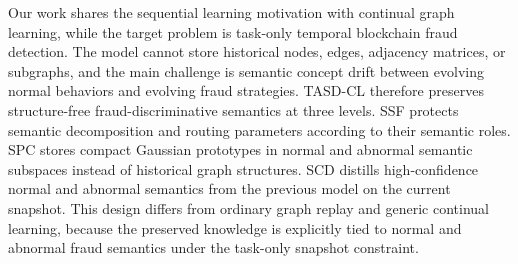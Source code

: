 Our work shares the sequential learning motivation with continual graph learning, while the target problem is task-only temporal blockchain fraud detection. The model cannot store historical nodes, edges, adjacency matrices, or subgraphs, and the main challenge is semantic concept drift between evolving normal behaviors and evolving fraud strategies. TASD-CL therefore preserves structure-free fraud-discriminative semantics at three levels. SSF protects semantic decomposition and routing parameters according to their semantic roles. SPC stores compact Gaussian prototypes in normal and abnormal semantic subspaces instead of historical graph structures. SCD distills high-confidence normal and abnormal semantics from the previous model on the current snapshot. This design differs from ordinary graph replay and generic continual learning, because the preserved knowledge is explicitly tied to normal and abnormal fraud semantics under the task-only snapshot constraint.